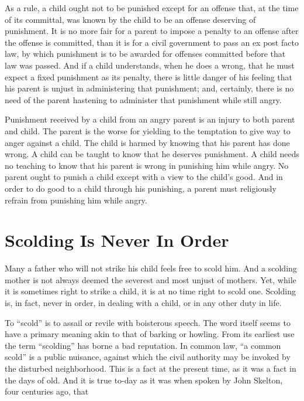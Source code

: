 \documentclass[
]{book}
\begin{document}
As a rule, a child ought not to be punished except for an offense that, at the time of its committal, was known by the child to be an offense deserving of punishment. It is no more fair for a parent to impose a penalty to an offense after the offense is committed, than it is for a civil government to pass an ex post facto law, by which punishment is to be awarded for offenses committed before that law was passed. And if a child understands, when he does a wrong, that he must expect a fixed punishment as its penalty, there is little danger of his feeling that his parent is unjust in administering that punishment; and, certainly, there is no need of the parent hastening to administer that punishment while still angry.

Punishment received by a child from an angry parent is an injury to both parent and child. The parent is the worse for yielding to the temptation to give way to anger against a child. The child is harmed by knowing that his parent has done wrong. A child can be taught to know that he deserves punishment. A child needs no teaching to know that his parent is wrong in punishing him while angry. No parent ought to punish a child except with a view to the child's good. And in order to do good to a child through his punishing, a parent must religiously refrain from punishing him while angry.

\hypertarget{scolding-is-never-in-order}{%
\chapter{Scolding Is Never In Order}\label{scolding-is-never-in-order}}

Many a father who will not strike his child feels free to scold him. And a scolding mother is not always deemed the severest and most unjust of mothers. Yet, while it is sometimes right to strike a child, it is at no time right to scold one. Scolding is, in fact, never in order, in dealing with a child, or in any other duty in life.

To ``scold'' is to assail or revile with boisterous speech. The word itself seems to have a primary meaning akin to that of barking or howling. From its earliest use the term ``scolding'' has borne a bad reputation. In common law, ``a common scold'' is a public nuisance, against which the civil authority may be invoked by the disturbed neighborhood. This is a fact at the present time, as it was a fact in the days of old. And it is true to-day as it was when spoken by John Skelton, four centuries ago, that
\end{document}
